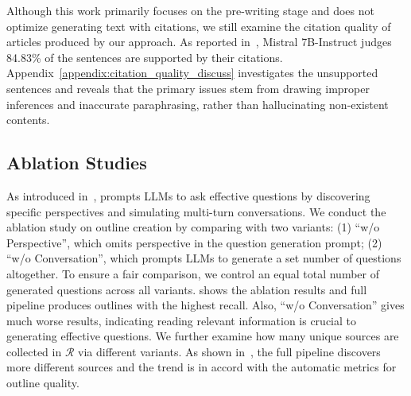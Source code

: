 \begin{table}
\centering
{}
\caption{Citation quality judged by Mistral 7B-Instruct.}
\label{table:citation_quality}
\vspace{-0.5em}
\end{table}


Although this work primarily focuses on the pre-writing stage and does not optimize generating text with citations, we still examine the citation quality of articles produced by our approach. As reported in~, Mistral 7B-Instruct judges 84.83\% of the sentences are supported by their citations. Appendix~\ref{appendix:citation_quality_discuss} investigates the unsupported sentences and reveals that the primary issues stem from drawing improper inferences and inaccurate paraphrasing, rather than hallucinating non-existent contents.



\subsection{Ablation Studies}
\begin{table}
\centering
{}
\caption{Average number of unique references ($|\mathcal{R}|$) collected using different methods.}
\label{table:ablation_d}
\end{table}

As introduced in~, \system prompts LLMs to ask effective questions by discovering specific perspectives and simulating multi-turn conversations. We conduct the ablation study on outline creation by comparing \system with two variants: (1) ``\system w/o Perspective'', which omits perspective in the question generation prompt; (2) ``\system w/o Conversation'', which prompts LLMs to generate a set number of questions altogether. To ensure a fair comparison, we control an equal total number of generated questions across all variants.  shows the ablation results and full \system pipeline produces outlines with the highest recall. Also, ``\system w/o Conversation'' gives much worse results, indicating reading relevant information is crucial to generating effective questions. We further examine how many unique sources are collected in $\mathcal{R}$ via different variants. As shown in~, the full pipeline discovers more different sources and the trend is in accord with the automatic metrics for outline quality.

